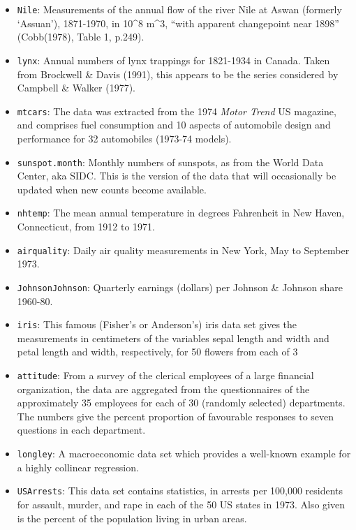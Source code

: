 \documentclass[
]{book}
\begin{document}
\begin{itemize}
\item
  \texttt{Nile}:
  Measurements of the annual flow of the river Nile at Aswan (formerly
  `Assuan'), 1871-1970, in 10\^{}8 m\^{}3, ``with apparent changepoint near
  1898'' (Cobb(1978), Table 1, p.249).
\item
  \texttt{lynx}:
  Annual numbers of lynx trappings for 1821-1934 in Canada. Taken from
  Brockwell \& Davis (1991), this appears to be the series considered by
  Campbell \& Walker (1977).
\item
  \texttt{mtcars}:
  The data was extracted from the 1974 \emph{Motor Trend} US magazine, and
  comprises fuel consumption and 10 aspects of automobile design and
  performance for 32 automobiles (1973-74 models).
\item
  \texttt{sunspot.month}:
  Monthly numbers of sunspots, as from the World Data Center, aka SIDC.
  This is the version of the data that will occasionally be updated when
  new counts become available.
\item
  \texttt{nhtemp}:
  The mean annual temperature in degrees Fahrenheit in New Haven,
  Connecticut, from 1912 to 1971.
\item
  \texttt{airquality}:
  Daily air quality measurements in New York, May to September 1973.
\item
  \texttt{JohnsonJohnson}:
  Quarterly earnings (dollars) per Johnson \& Johnson share 1960-80.
\item
  \texttt{iris}:
  This famous (Fisher's or Anderson's) iris data set gives the
  measurements in centimeters of the variables sepal length and width and
  petal length and width, respectively, for 50 flowers from each of 3
\item
  \texttt{attitude}:
  From a survey of the clerical employees of a large financial
  organization, the data are aggregated from the questionnaires of the
  approximately 35 employees for each of 30 (randomly selected)
  departments. The numbers give the percent proportion of favourable
  responses to seven questions in each department.
\item
  \texttt{longley}:
  A macroeconomic data set which provides a well-known example for a
  highly collinear regression.
\item
  \texttt{USArrests}:
  This data set contains statistics, in arrests per 100,000 residents for
  assault, murder, and rape in each of the 50 US states in 1973. Also
  given is the percent of the population living in urban areas.
\end{itemize}

  
\end{document}
